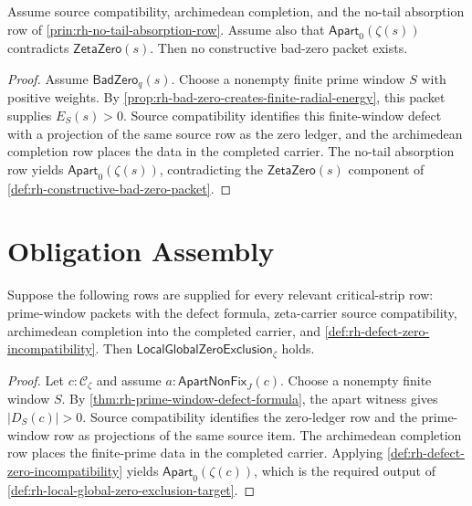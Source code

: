 \begin{theorem}
\label{thm:rh-bad-zero-contradiction-route}
Assume source compatibility, archimedean completion, and the no-tail
absorption row of \autoref{prin:rh-no-tail-absorption-row}.  Assume also
that $\mathsf{Apart}_{0}(\zeta(s))$ contradicts
$\mathsf{ZetaZero}(s)$.  Then no constructive bad-zero packet exists.
\end{theorem}

\begin{proof}
Assume $\mathsf{BadZero}_q(s)$.  Choose a nonempty finite prime window $S$
with positive weights.  By
\autoref{prop:rh-bad-zero-creates-finite-radial-energy}, this packet
supplies $E_S(s)>0$.  Source compatibility identifies this finite-window
defect with a projection of the same source row as the zero ledger, and the
archimedean completion row places the data in the completed carrier.  The
no-tail absorption row yields $\mathsf{Apart}_{0}(\zeta(s))$, contradicting
the $\mathsf{ZetaZero}(s)$ component of
\autoref{def:rh-constructive-bad-zero-packet}.
\end{proof}

\section{Obligation Assembly}
\label{sec:rh-local-global-obligation-assembly}

\begin{theorem}
\label{thm:rh-four-obligations-assemble-local-global-target}
Suppose the following rows are supplied for every relevant critical-strip
row: prime-window packets with the defect formula, zeta-carrier source
compatibility, archimedean completion into the completed carrier, and
\autoref{def:rh-defect-zero-incompatibility}. Then
$\mathsf{LocalGlobalZeroExclusion}_{\zeta}$ holds.
\end{theorem}

\begin{proof}
Let $c:\mathcal C_{\zeta}$ and assume
$a:\mathsf{ApartNonFix}_{J}(c)$. Choose a nonempty finite window $S$. By
\autoref{thm:rh-prime-window-defect-formula}, the apart witness gives
$|D_S(c)|>0$. Source compatibility identifies the zero-ledger row and the
prime-window row as projections of the same source item. The archimedean
completion row places the finite-prime data in the completed carrier.
Applying \autoref{def:rh-defect-zero-incompatibility} yields
$\mathsf{Apart}_{0}(\zeta(c))$, which is the required output of
\autoref{def:rh-local-global-zero-exclusion-target}.
\end{proof}

